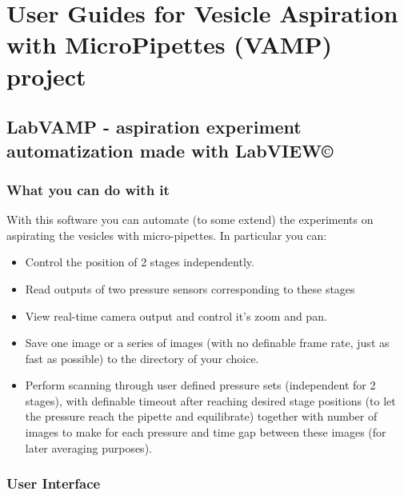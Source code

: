 
\chapter{User Guides for Vesicle Aspiration with MicroPipettes (VAMP) project}

\section{LabVAMP - aspiration experiment automatization made with LabVIEW\copyright{}}\label{labvamp}

\subsection{What you can do with it}\label{labvamp-features}

With this software you can automate (to some extend) the experiments on aspirating the vesicles with micro-pipettes. In particular you can:
\begin{itemize}
	\item Control the position of 2 stages independently.
	\item Read outputs of two pressure sensors corresponding to these stages
	\item View real-time camera output and control it's zoom and pan.
	\item Save one image or a series of images (with no definable frame rate, just as fast as possible) to the directory of your choice.
	\item Perform scanning through user defined pressure sets (independent for 2 stages), with definable timeout after reaching desired stage positions (to let the pressure reach the pipette and equilibrate) together with number of images to make for each pressure and time gap between these images (for later averaging purposes).
\end{itemize}

\subsection{User Interface}\label{labvamp-ui}

